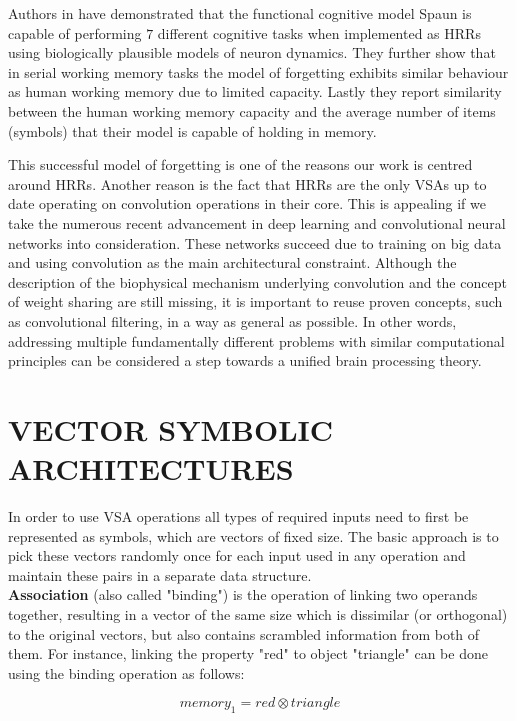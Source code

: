 \documentclass[a4paper,twoside]{article}
\begin{document}
	Authors in \cite{Eliasmith:2012:LargeScaleModel} have demonstrated that the functional cognitive model Spaun is capable of performing $7$ different cognitive tasks when implemented as HRRs using biologically plausible models of neuron dynamics.
They further show that in serial working memory tasks the model of forgetting exhibits similar behaviour as human working memory due to limited capacity.
Lastly they report similarity between the human working memory capacity and the average number of items (symbols) that their model is capable of holding in memory.

	This successful model of forgetting is one of the reasons our work is centred around HRRs. Another reason is the fact that HRRs are the only VSAs up to date operating on convolution operations in their core.
This is appealing if we take the numerous recent advancement in deep learning and convolutional neural networks into consideration.
These networks succeed due to training on big data and using convolution as the main architectural constraint.
Although the description of the biophysical mechanism underlying convolution and the concept of weight sharing are still missing, it is important to reuse proven concepts, such as convolutional filtering, in a way as general as possible.
In other words, addressing multiple fundamentally different problems with similar computational principles can be considered a step towards a unified brain processing theory.
	
	\section{VECTOR SYMBOLIC ARCHITECTURES}
	
In order to use VSA operations all types of required inputs need to first be represented as symbols, which are vectors of fixed size. The basic approach is to pick these vectors randomly once for each input used in any operation and maintain these pairs in a separate data structure.	
	\\
	
	\textbf{Association} (also called "binding") is the operation of linking two operands together, resulting in a vector of the same size which is dissimilar (or orthogonal) to the original vectors, but also contains scrambled information from both of them.
For instance, linking the property "red" to object "triangle" can be done using the binding operation as follows:
	
	\begin{equation}
	memory_1 = red \otimes triangle
	\end{equation}
	
\end{document}
